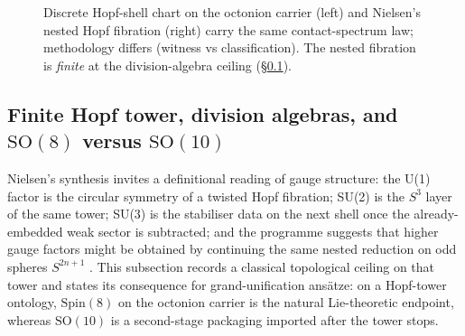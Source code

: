 \documentclass[11pt]{amsart}
\begin{document}
\begin{figure}[ht]
  \centering
  \footnotesize
  \caption{Discrete Hopf-shell chart on the octonion carrier (left) and Nielsen's nested Hopf fibration (right) carry the same contact-spectrum law; methodology differs (witness vs classification). The nested fibration is \emph{finite} at the division-algebra ceiling (§\ref{sec:hopf-tower-ceiling}).}
  \label{fig:hopf-compare}
\end{figure}

\subsection{Finite Hopf tower, division algebras, and \texorpdfstring{$\mathrm{SO}(8)$}{SO(8)} versus \texorpdfstring{$\mathrm{SO}(10)$}{SO(10)}}
\label{sec:hopf-tower-ceiling}

Nielsen's synthesis invites a definitional reading of gauge structure: the U(1) factor is the circular symmetry of a twisted Hopf fibration; SU(2) is the $S^3$ layer of the same tower; SU(3) is the stabiliser data on the next shell once the already-embedded weak sector is subtracted; and the programme suggests that higher gauge factors might be obtained by continuing the same nested reduction on odd spheres $S^{2n+1}$ \cite{NielsenTUFT2026,hopf1931,Husemoller1994}. This subsection records a classical topological ceiling on that tower and states its consequence for grand-unification ans\"atze: on a Hopf-tower ontology, $\mathrm{Spin}(8)$ on the octonion carrier is the natural Lie-theoretic endpoint, whereas $\mathrm{SO}(10)$ is a second-stage packaging imported after the tower stops.
\end{document}
